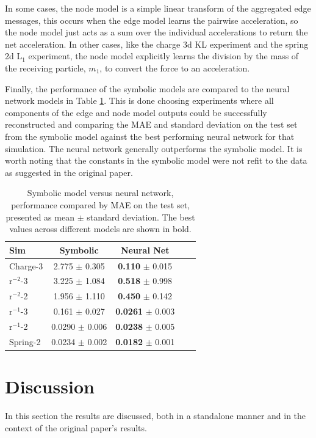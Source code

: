 \documentclass[11pt]{article}
\begin{document}
    In some cases, the node model is a simple linear transform of the aggregated edge messages, this occurs when the edge model learns the pairwise acceleration, so the node model just acts as a sum over the individual accelerations to return the net acceleration. In other cases, like the charge 3d KL experiment and the spring 2d L$_1$ experiment, the node model explicitly learns the division by the mass of the receiving particle, $m_1$, to convert the force to an acceleration.

    Finally, the performance of the symbolic models are compared to the neural network models in Table \ref{tab:sr_vs_nn_table}. This is done choosing experiments where all components of the edge and node model outputs could be successfully reconstructed and comparing the MAE and standard deviation on the test set from the symbolic model against the best performing neural network for that simulation. The neural network generally outperforms the symbolic model. It is worth noting that the constants in the symbolic model were not refit to the data as suggested in the original paper.
    \begin{table}[H]
        \centering
        \begin{tabular}{lcccc}
        \hline
        Sim & Symbolic & Neural Net \\
        \hline
        Charge-3 & 2.775 $\pm$ 0.305 & \textbf{0.110} $\pm$ 0.015 \\
        r$^{-2}$-3 & 3.225 $\pm$ 1.084 & \textbf{0.518} $\pm$ 0.998\\
        r$^{-2}$-2 & 1.956 $\pm$ 1.110 & \textbf{0.450} $\pm$ 0.142 \\
        r$^{-1}$-3 & 0.161 $\pm$ 0.027 &\textbf{0.0261} $\pm$ 0.003 \\
        r$^{-1}$-2 & 0.0290 $\pm$ 0.006 & \textbf{0.0238} $\pm$ 0.005 \\
        Spring-2 & 0.0234 $\pm$ 0.002 &\textbf{0.0182} $\pm$ 0.001 \\
        \hline
        \end{tabular}
        \caption{Symbolic model versus neural network, performance compared by MAE on the test set, presented as mean $\pm$ standard deviation. The best values across different models are shown in bold.}
        \label{tab:sr_vs_nn_table}
    \end{table}
\section{Discussion}
In this section the results are discussed, both in a standalone manner and in the context of the original paper's results.
\end{document}
